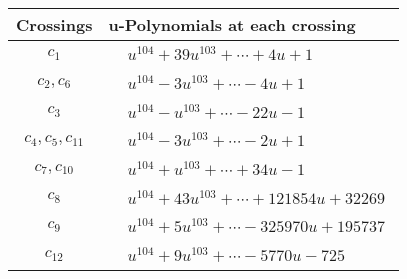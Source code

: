 \documentclass[1p]{elsarticle_modified}
\theoremstyle{definition}
\begin{document}
\begin{tabular}{m{50pt}|m{274pt}}
Crossings & \hspace{64pt}u-Polynomials at each crossing \\
\hline $$\begin{aligned}c_{1}\end{aligned}$$&$\begin{aligned}
&u^{104}+39 u^{103}+\cdots+4 u+1
\end{aligned}$\\
\hline $$\begin{aligned}c_{2},c_{6}\end{aligned}$$&$\begin{aligned}
&u^{104}-3 u^{103}+\cdots-4 u+1
\end{aligned}$\\
\hline $$\begin{aligned}c_{3}\end{aligned}$$&$\begin{aligned}
&u^{104}- u^{103}+\cdots-22 u-1
\end{aligned}$\\
\hline $$\begin{aligned}c_{4},c_{5},c_{11}\end{aligned}$$&$\begin{aligned}
&u^{104}-3 u^{103}+\cdots-2 u+1
\end{aligned}$\\
\hline $$\begin{aligned}c_{7},c_{10}\end{aligned}$$&$\begin{aligned}
&u^{104}+u^{103}+\cdots+34 u-1
\end{aligned}$\\
\hline $$\begin{aligned}c_{8}\end{aligned}$$&$\begin{aligned}
&u^{104}+43 u^{103}+\cdots+121854 u+32269
\end{aligned}$\\
\hline $$\begin{aligned}c_{9}\end{aligned}$$&$\begin{aligned}
&u^{104}+5 u^{103}+\cdots-325970 u+195737
\end{aligned}$\\
\hline $$\begin{aligned}c_{12}\end{aligned}$$&$\begin{aligned}
&u^{104}+9 u^{103}+\cdots-5770 u-725
\end{aligned}$\\
\hline
\end{tabular}\\~\\
\end{document}
